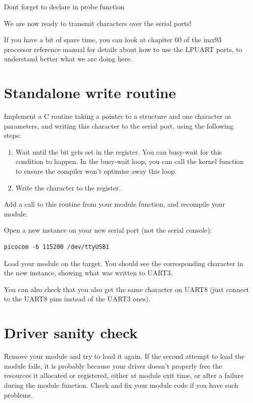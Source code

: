 Dont forget to declare  in probe function 

We are now ready to transmit characters over the serial ports!

If you have a bit of spare time, you can look at chapiter 60 of the
imx93 processor reference manual for details about how to use the LPUART ports, to understand
better what we are doing here.

\section{Standalone write routine}

Implement a C routine taking a pointer to a 
structure and one character as parameters, and writing
this character to the serial port, using the following steps:

\begin{enumerate}
\item Wait until the  bit gets set in the
   register.  You can busy-wait for this condition to happen.
  In the busy-wait loop, you can call the  kernel function
  to ensure the compiler won't optimise away this loop.
\item Write the character to the  register.
\end{enumerate}

Add a call to this routine from your module  function,
and recompile your module.

Open a new  instance on your new serial port (not the
serial console):

\begin{verbatim}
picocom -b 115200 /dev/ttyUSB1
\end{verbatim}

Load your module on the target. You should see the
corresponding character in the new  instance,
showing what was written to UART3.

You can also check that you also get the same character on UART8
(just connect to the UART8 pins instead of the UART3 ones).

\section{Driver sanity check}

Remove your module and try to load it again. If the second attempt to
load the module fails, it is probably because your driver doesn't
properly free the resources it allocated or registered, either at module
exit time, or after a failure during the module  function. Check
and fix your module code if you have such problems.
